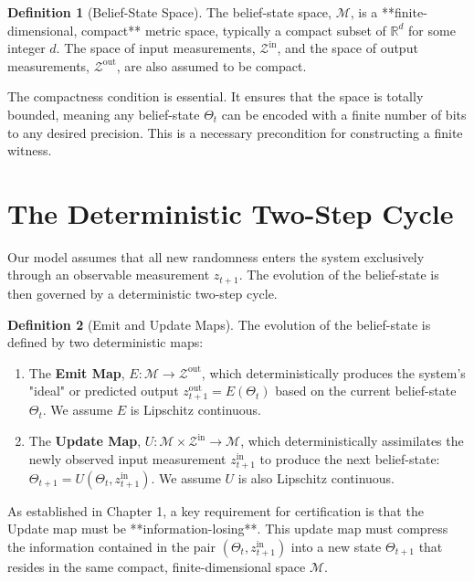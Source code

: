 \documentclass[12pt]{article}
\theoremstyle{definition}
\newtheorem{definition}{Definition}[section]
\theoremstyle{plain}
\begin{document}
\begin{definition}[Belief-State Space]
\label{def:belief-state-space}
The belief-state space, $\mathcal{M}$, is a **finite-dimensional, compact** metric space, typically a compact subset of $\mathbb{R}^d$ for some integer $d$. The space of input measurements, $\mathcal{Z}^{\text{in}}$, and the space of output measurements, $\mathcal{Z}^{\text{out}}$, are also assumed to be compact.
\end{definition}

The compactness condition is essential. It ensures that the space is totally bounded, meaning any belief-state $\Theta_t$ can be encoded with a finite number of bits to any desired precision. This is a necessary precondition for constructing a finite witness.

\section{The Deterministic Two-Step Cycle}

Our model assumes that all new randomness enters the system exclusively through an observable measurement $z_{t+1}$. The evolution of the belief-state is then governed by a deterministic two-step cycle.

\begin{definition}[Emit and Update Maps]
\label{def:emit-update-maps}
The evolution of the belief-state is defined by two deterministic maps:
\begin{enumerate}
    \item The \textbf{Emit Map}, $E: \mathcal{M} \to \mathcal{Z}^{\text{out}}$, which deterministically produces the system's "ideal" or predicted output $z^{\text{out}}_{t+1} = E(\Theta_t)$ based on the current belief-state $\Theta_t$. We assume $E$ is Lipschitz continuous.
    \item The \textbf{Update Map}, $U: \mathcal{M} \times \mathcal{Z}^{\text{in}} \to \mathcal{M}$, which deterministically assimilates the newly observed input measurement $z^{\text{in}}_{t+1}$ to produce the next belief-state: $\Theta_{t+1} = U(\Theta_t, z^{\text{in}}_{t+1})$. We assume $U$ is also Lipschitz continuous.
\end{enumerate}
\end{definition}

As established in Chapter 1, a key requirement for certification is that the Update map must be **information-losing**. This update map must compress the information contained in the pair $(\Theta_t, z^{\text{in}}_{t+1})$ into a new state $\Theta_{t+1}$ that resides in the same compact, finite-dimensional space $\mathcal{M}$.
\end{document}
